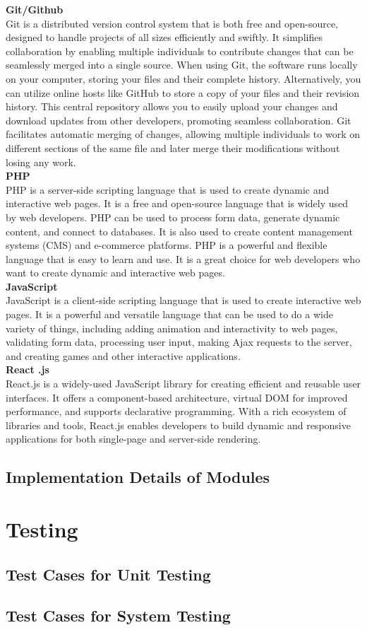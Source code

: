 \textbf{Git/Github}\\
Git is a distributed version control system that is both free and open-source, designed to handle projects of all sizes efficiently and swiftly. It simplifies collaboration by enabling multiple individuals to contribute changes that can be seamlessly merged into a single source. When using Git, the software runs locally on your computer, storing your files and their complete history. Alternatively, you can utilize online hosts like GitHub to store a copy of your files and their revision history. This central repository allows you to easily upload your changes and download updates from other developers, promoting seamless collaboration. Git facilitates automatic merging of changes, allowing multiple individuals to work on different sections of the same file and later merge their modifications without losing any work.\\
\textbf{PHP}\\
PHP is a server-side scripting language that is used to create dynamic and interactive web pages. It is a free and open-source language that is widely used by web developers. PHP can be used to process form data, generate dynamic content, and connect to databases. It is also used to create content management systems (CMS) and e-commerce platforms.
PHP is a powerful and flexible language that is easy to learn and use. It is a great choice for web developers who want to create dynamic and interactive web pages.\\
\textbf{JavaScript}\\
JavaScript is a client-side scripting language that is used to create interactive web pages. It is a powerful and versatile language that can be used to do a wide variety of things, including adding animation and interactivity to web pages, validating form data, processing user input, making Ajax requests to the server, and creating games and other interactive applications.\\
\textbf{React .js}\\
React.js is a widely-used JavaScript library for creating efficient and reusable user interfaces. It offers a component-based architecture, virtual DOM for improved performance, and supports declarative programming. With a rich ecosystem of libraries and tools, React.js enables developers to build dynamic and responsive applications for both single-page and server-side rendering.\\
\subsection{Implementation Details of Modules}
\section{Testing}
\subsection{Test Cases for Unit Testing}
\subsection{Test Cases for System Testing}